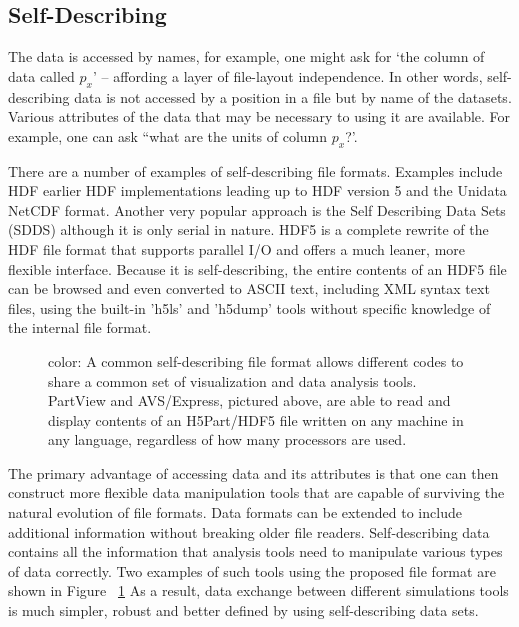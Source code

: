 \documentclass[acus]{JAC2003}
\begin{document}
\subsection{Self-Describing}
The data is accessed by names, for example, one might ask for `the
column of data called $p_x$' -- affording a layer of file-layout independence.
In other words, self-describing data is
not accessed by a position in a file but by name of the datasets.  Various attributes
of the data that may be necessary to using it are available. For
example, one can ask ``what are the units of column $p_x$?'. 

There are a number of examples of self-describing file formats.  Examples include HDF earlier HDF implementations leading up to HDF version 5 and the Unidata NetCDF format.  Another
very popular approach is the Self Describing Data Sets (SDDS) \cite{SDDS} although it 
is only serial in nature. HDF5 is a complete rewrite of the HDF file format that supports
parallel I/O and offers a much leaner, more flexible interface.
Because it is self-describing, the entire contents of an HDF5 file can be
browsed and even converted to ASCII text, including XML syntax text files,
using the built-in 'h5ls' and 'h5dump' 
tools without specific knowledge of the internal file format.

\begin{figure}[htb]
\begin{minipage}[b]{0.5\textwidth}
\end{minipage}
\caption{color: A common self-describing file format allows different codes to share a common set of visualization and data analysis tools.  PartView and AVS/Express, pictured above, are able to read and display contents of  an H5Part/HDF5 file written on any machine in any language, regardless of how many processors are used.}
\label{fig:vis}
\end{figure}

The primary advantage of accessing data and its attributes is that one
can then construct more flexible data manipulation tools that are capable
of surviving the natural evolution of file formats.  Data formats can be extended
to include additional information without breaking older file readers. 
Self-describing data contains all the information
that analysis tools need to manipulate various types of data
correctly. Two examples of such tools using the proposed file format
are shown in Figure ~\ref{fig:vis} As a result, data exchange between different simulations tools is
much simpler, robust  and better defined by using self-describing data sets. 
\end{document}
